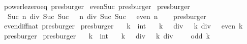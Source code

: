 \begin{isabellebody}
\ power{\isacharunderscore}{\kern0pt}le{\isacharunderscore}{\kern0pt}zero{\isacharunderscore}{\kern0pt}eq\ {\isacharbrackleft}{\kern0pt}presburger{\isacharbrackright}{\kern0pt}\isanewline
\isanewline
{}\isamarkupfalse%
\isanewline
\isanewline
{}\isamarkupfalse%
\ even{\isacharunderscore}{\kern0pt}Suc\ {\isacharbrackleft}{\kern0pt}presburger{\isacharbrackright}{\kern0pt}\isanewline
\isanewline
{}\isamarkupfalse%
\ {\isacharbrackleft}{\kern0pt}presburger{\isacharbrackright}{\kern0pt}{\isacharcolon}{\kern0pt}\isanewline
\ \ {\isachardoublequoteopen}Suc\ n\ div\ Suc\ {\isacharparenleft}{\kern0pt}Suc\ {}{\isacharparenright}{\kern0pt}\ {\isacharequal}{\kern0pt}\ n\ div\ Suc\ {\isacharparenleft}{\kern0pt}Suc\ {}{\isacharparenright}{\kern0pt}\ {\isasymlongleftrightarrow}\ even\ n{\isachardoublequoteclose}\isanewline
%
\isadelimproof
\ \ %
\endisadelimproof
%
\isatagproof
{}\isamarkupfalse%
\ presburger%
\endisatagproof
{\isafoldproof}%
%
\isadelimproof
\isanewline
%
\endisadelimproof
\isanewline
{}\isamarkupfalse%
\ even{\isacharunderscore}{\kern0pt}diff{\isacharunderscore}{\kern0pt}nat\ {\isacharbrackleft}{\kern0pt}presburger{\isacharbrackright}{\kern0pt}\isanewline
\isanewline
{}\isamarkupfalse%
\ {\isacharbrackleft}{\kern0pt}presburger{\isacharbrackright}{\kern0pt}{\isacharcolon}{\kern0pt}\isanewline
\ \ \ k\ {\isacharcolon}{\kern0pt}{\isacharcolon}{\kern0pt}\ int\isanewline
\ \ \ {\isachardoublequoteopen}{\isacharparenleft}{\kern0pt}k\ {\isacharplus}{\kern0pt}\ {}{\isacharparenright}{\kern0pt}\ div\ {}\ {\isacharequal}{\kern0pt}\ k\ div\ {}\ {\isasymlongleftrightarrow}\ even\ k{\isachardoublequoteclose}\isanewline
%
\isadelimproof
\ \ %
\endisadelimproof
%
\isatagproof
{}\isamarkupfalse%
\ presburger%
\endisatagproof
{\isafoldproof}%
%
\isadelimproof
\isanewline
%
\endisadelimproof
\isanewline
{}\isamarkupfalse%
\ {\isacharbrackleft}{\kern0pt}presburger{\isacharbrackright}{\kern0pt}{\isacharcolon}{\kern0pt}\isanewline
\ \ \ k\ {\isacharcolon}{\kern0pt}{\isacharcolon}{\kern0pt}\ int\isanewline
\ \ \ {\isachardoublequoteopen}{\isacharparenleft}{\kern0pt}k\ {\isacharplus}{\kern0pt}\ {}{\isacharparenright}{\kern0pt}\ div\ {}\ {\isacharequal}{\kern0pt}\ k\ div\ {}\ {\isacharplus}{\kern0pt}\ {}\ {\isasymlongleftrightarrow}\ odd\ k{\isachardoublequoteclose}\isanewline

\end{isabellebody}
